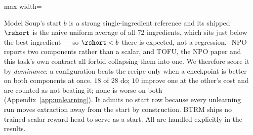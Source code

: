 \begin{table}[t]
\begin{adjustbox}{max width=\linewidth}
\end{adjustbox}
\par\vspace{2pt}
{\footnotesize Model Soup's start $b$ is a strong single-ingredient reference and its shipped
$\rshort$ is the naive uniform average of all 72 ingredients, which sits just below the best
ingredient --- so $\rshort<b$ there is expected, not a regression. $^{\dagger}$NPO reports two components rather than a scalar, and TOFU, the
NPO paper and this task's own contract all forbid collapsing them into one. We therefore score it by
\emph{dominance}: a configuration beats the recipe only when a checkpoint is better on both components
at once. $18$ of $28$ do; $10$ improve one at the other's cost and are counted as not beating it; none
is worse on both (Appendix~\ref{app:unlearning}). It admits no start row because every unlearning run
moves extraction away from the start by construction. BTRM ships no trained scalar reward head to serve
as a start. All are handled explicitly in the results.}
\end{table}
